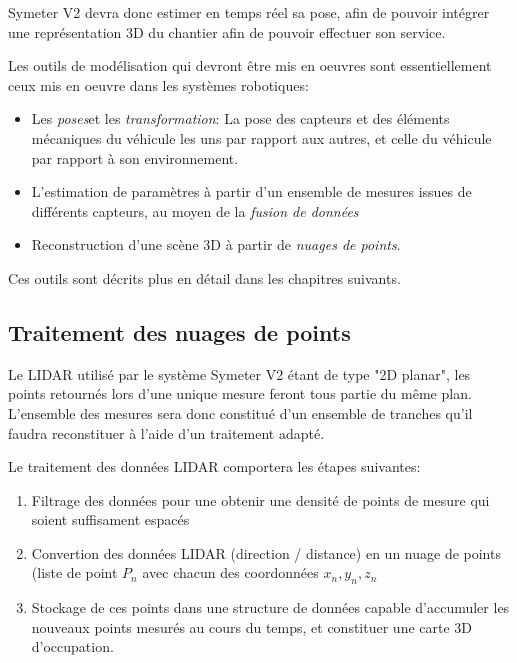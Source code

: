 \documentclass[12pt,a4paper]{report}
\begin{document}
	\para Symeter V2 devra donc estimer en temps réel sa pose, afin de pouvoir intégrer une représentation 3D du chantier afin de pouvoir effectuer son service.
	
	\para Les outils de modélisation qui devront être mis en oeuvres sont essentiellement ceux mis en oeuvre dans les systèmes robotiques:
	 \begin{itemize}
	 	\item Les \textit{poses}et les \textit{transformation}: La pose des capteurs et des éléments mécaniques du véhicule les uns par rapport aux autres, et celle du véhicule par rapport à son environnement.
	 	\item L'estimation de paramètres à partir d'un ensemble de mesures issues de différents capteurs, au moyen de la \textit{fusion de données}
	 	\item Reconstruction d'une scène 3D à partir de \textit{nuages de points}.
	 \end{itemize} 
 
   \para Ces outils sont décrits plus en détail dans les chapitres suivants.
			
		\subsection{Traitement des nuages de points}
		
		
		Le LIDAR utilisé par le système Symeter V2 étant de type "2D planar", les points retournés lors d'une unique mesure feront tous partie du même plan. L'ensemble des mesures sera donc constitué d'un ensemble de tranches qu'il faudra reconstituer à l'aide d'un traitement adapté.
		
		\para Le traitement des données LIDAR comportera les étapes suivantes:
		\begin{enumerate}
			\item Filtrage des données pour une obtenir une densité de points de mesure qui soient suffisament espacés
			\item Convertion des données LIDAR (direction / distance) en un nuage de points (liste de point $P_n$ avec chacun des coordonnées $x_n, y_n, z_n$
			\item Stockage de ces points dans une structure de données capable d'accumuler les nouveaux points mesurés au cours du temps, et constituer une carte 3D d'occupation.
 		\end{enumerate}
 	
\end{document}
